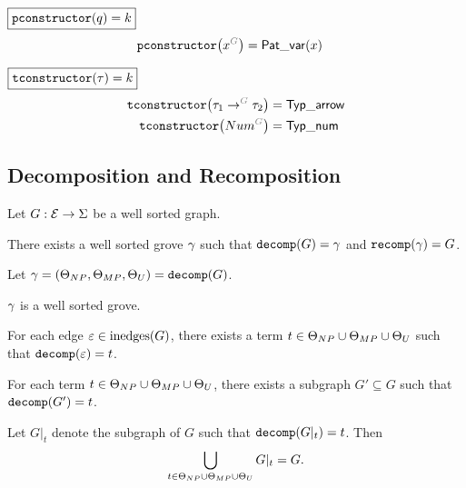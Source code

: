 \noindent $\boxed{\pconstructor{q} = k}$
%
\begin{align*}
  \pconstructor{\pVar{G}{x}} &= \PatVar(x)
\end{align*}

\noindent $\boxed{\tconstructor{\tau} = k}$
%
\begin{align*}
  \tconstructor{\tArrow{G}{\tau_1}{\tau_2}} &= \TypArrow \\
  \tconstructor{\tNum{G}} &= \TypNum
\end{align*}


\subsection{Decomposition and Recomposition}
\label{sec:Formalism:Decomposition and Recomposition}

Let $G : \E \rightarrow \Sigma$ be a well sorted graph.

\begin{theorem}
  There exists a well sorted grove $\Grove$ such that $\decomp{G} = \Grove$ and $\recomp{\Grove} = G$.
\end{theorem}



Let $\Grove = (\Set[NP], \Set[MP], \Set[U]) = \decomp{G}$.

\begin{lemma}
  $\Grove$ is a well sorted grove.
\end{lemma}

\begin{lemma}
  For each edge $\e \in \inedges{G}$,
  there exists a term $t \in \Set[NP] \cup \Set[MP] \cup \Set[U]$
  such that $\decomp{\e} = t$.
\end{lemma}

\begin{lemma}
  For each term $t \in \Set[NP] \cup \Set[MP] \cup \Set[U]$,
  there exists a subgraph $G' \subseteq G$ such that $\decomp{G'} = t$.
\end{lemma}

\begin{lemma}
  Let $G|_t$ denote the subgraph of $G$ such that $\decomp{G|_t} = t$.
  Then
  \[
    \bigcup_{t \in \Set[NP] \cup \Set[MP] \cup \Set[U]} G|_t = G.
  \]
\end{lemma}

